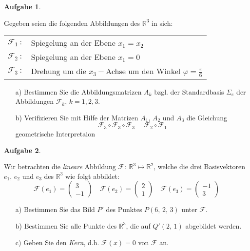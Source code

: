 \documentclass[10pt]{article}
\newtheorem{A}{Aufgabe}
\newcommand{\R}{{\mathbb R}}
\begin{document}
\begin{sffamily}
\endpicture

\begin{A}  \end{A}
Gegeben seien die folgenden Abbildungen des $\R^3$ in sich:
\begin{center}
\begin{tabular}{l l}
 $\mathcal{F}_1\::$ & Spiegelung an der Ebene $x_1 = x_2$\\
 $\mathcal{F}_2\::$ & Spiegelung an der Ebene $x_1 = 0$\\
 $\mathcal{F}_3\::$ & Drehung um die  $x_3 - $Achse um den Winkel $\varphi = \frac{\pi}{6}$\\
\end{tabular}
\end{center}
\begin{enumerate}
\item[a)] Bestimmen Sie die Abbildungsmatrizen $A_k$ bzgl. der
Standardbasis $\Sigma_e$ der Abbildungen $\mathcal{F}_k$, $k = 1, 2,
3$. \item[b)] Verifizieren Sie mit Hilfe der Matrizen $A_1$, $A_2$
und $A_3$ die Gleichung
\[
 \mathcal{F}_3\circ\mathcal{F}_3\circ\mathcal{F}_3 = \mathcal{F}_2\circ\mathcal{F}_1
\]
geometrische Interpretaion
\end{enumerate}

\begin{A}  \end{A}
Wir betrachten die {\em lineare} Abbildung
$\mathcal{F}:\:\R^3\longmapsto\R^2$, welche die drei Basisvektoren
$e_1$, $e_2$ und $e_3$ des $\R^3$ wie folgt abbildet:
\[
 \mathcal{F}(e_1) = \left( \begin{array}{r}
                            3\\-1
                           \end{array} \right)\quad
 \mathcal{F}(e_2) = \left( \begin{array}{r}
                            2\\1
                           \end{array} \right)\quad
 \mathcal{F}(e_3) = \left( \begin{array}{r}
                            -1\\3
                           \end{array} \right)
\]
\begin{enumerate}
\item[a)] Bestimmen Sie das Bild $P'$ des Punktes $P(6,\, 2,\, 3)$ unter
$\mathcal{F}$. \item[b)] Bestimmen Sie alle Punkte des $\R^3$, die
auf $Q'(2,\,1)$ abgebildet werden. \item[c)] Geben Sie den {\em Kern},
d.h. $\mathcal{F}(x) = 0$ von $\mathcal{F}$ an.
\end{enumerate}


\end{sffamily}
\end{document}
